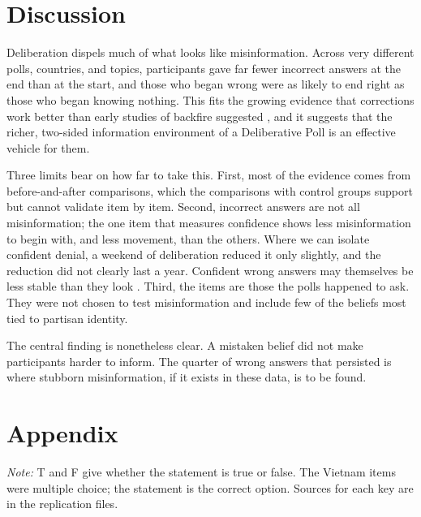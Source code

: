 \documentclass[11pt]{article}
\begin{document}
\FloatBarrier
\section{Discussion}

Deliberation dispels much of what looks like misinformation. Across very different polls, countries, and topics, participants gave far fewer incorrect answers at the end than at the start, and those who began wrong were as likely to end right as those who began knowing nothing. This fits the growing evidence that corrections work better than early studies of backfire suggested \citep{wood2019, chan2017}, and it suggests that the richer, two-sided information environment of a Deliberative Poll is an effective vehicle for them.

Three limits bear on how far to take this. First, most of the evidence comes from before-and-after comparisons, which the comparisons with control groups support but cannot validate item by item. Second, incorrect answers are not all misinformation; the one item that measures confidence shows less misinformation to begin with, and less movement, than the others. Where we can isolate confident denial, a weekend of deliberation reduced it only slightly, and the reduction did not clearly last a year. Confident wrong answers may themselves be less stable than they look \citep{graham2023}. Third, the items are those the polls happened to ask. They were not chosen to test misinformation and include few of the beliefs most tied to partisan identity.

The central finding is nonetheless clear. A mistaken belief did not make participants harder to inform. The quarter of wrong answers that persisted is where stubborn misinformation, if it exists in these data, is to be found.




\clearpage
\appendix
\section*{Appendix}
\setcounter{table}{0}
\renewcommand{\thetable}{A\arabic{table}}

\begin{table}[H]
\centering
\caption{Misinformation-type items in the seven Deliberative Polls}
\label{tab:items}

\begin{minipage}{0.9\linewidth}
\vspace{0.5em}\footnotesize \emph{Note:} T and F give whether the statement is true or false. The Vietnam items were multiple choice; the statement is the correct option. Sources for each key are in the replication files.
\end{minipage}
\end{table}
\end{document}
